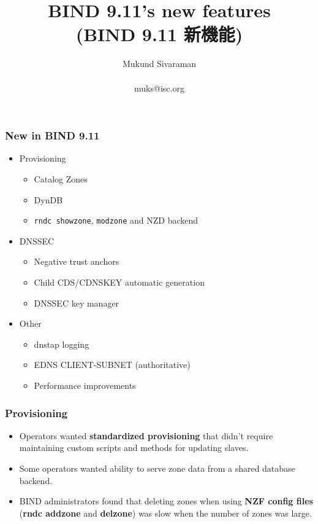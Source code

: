 \documentclass[aspectratio=169,14pt]{beamer}
\title{BIND 9.11's new features\\
(BIND 9.11 新機能)}
\author{Mukund Sivaraman\\
~\\
\small muks@isc.org}
\institute{Internet Systems Consortium}
\date{}
\begin{document}
\frame{\titlepage}

\frame
{
  \frametitle{New in BIND 9.11}

  \begin{itemize}

  \item Provisioning
    \begin{itemize}
    \item Catalog Zones
    \item DynDB
    \item \texttt{rndc showzone}, \texttt{modzone} and NZD backend
    \end{itemize}

  \item DNSSEC
    \begin{itemize}
      \item Negative trust anchors
      \item Child CDS/CDNSKEY automatic generation
      \item DNSSEC key manager
    \end{itemize}

  \item Other
    \begin{itemize}
    \item dnstap logging
    \item EDNS CLIENT-SUBNET (authoritative)
    \item Performance improvements
    \end{itemize}
  \end{itemize}
}

\frame
{
  \frametitle{Provisioning}

  \begin{itemize}

  \item Operators wanted \textbf{standardized provisioning} that didn't
    require maintaining custom scripts and methods for updating slaves.

  \item Some operators wanted ability to serve zone data from a shared
    database backend.

  \item BIND administrators found that deleting zones when using
    \textbf{NZF config files} (\textbf{rndc addzone} and
    \textbf{delzone}) was slow when the number of zones was large.

  \end{itemize}
}
\end{document}
